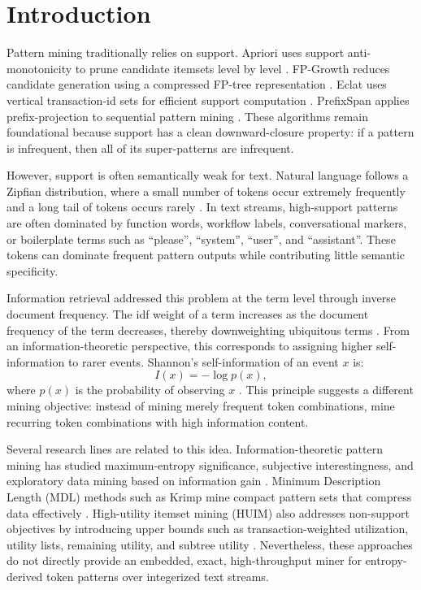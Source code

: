 \documentclass[11pt,a4paper]{article}
\begin{document}
\section{Introduction}

Pattern mining traditionally relies on support. Apriori uses support anti-monotonicity to prune candidate itemsets level by level \cite{AgrawalSrikant1994}. FP-Growth reduces candidate generation using a compressed FP-tree representation \cite{HanPeiYin2000}. Eclat uses vertical transaction-id sets for efficient support computation \cite{Zaki2000}. PrefixSpan applies prefix-projection to sequential pattern mining \cite{Pei2001PrefixSpan}. These algorithms remain foundational because support has a clean downward-closure property: if a pattern is infrequent, then all of its super-patterns are infrequent.

However, support is often semantically weak for text. Natural language follows a Zipfian distribution, where a small number of tokens occur extremely frequently and a long tail of tokens occurs rarely \cite{Zipf1949,Piantadosi2014Zipf}. In text streams, high-support patterns are often dominated by function words, workflow labels, conversational markers, or boilerplate terms such as ``please'', ``system'', ``user'', and ``assistant''. These tokens can dominate frequent pattern outputs while contributing little semantic specificity.

Information retrieval addressed this problem at the term level through inverse document frequency. The idf weight of a term increases as the document frequency of the term decreases, thereby downweighting ubiquitous terms \cite{ManningRaghavanSchutze2008IR}. From an information-theoretic perspective, this corresponds to assigning higher self-information to rarer events. Shannon's self-information of an event \(x\) is:
\[
I(x)=-\log p(x),
\]
where \(p(x)\) is the probability of observing \(x\) \cite{Shannon1948}. This principle suggests a different mining objective: instead of mining merely frequent token combinations, mine recurring token combinations with high information content.

Several research lines are related to this idea. Information-theoretic pattern mining has studied maximum-entropy significance, subjective interestingness, and exploratory data mining based on information gain \cite{Tatti2008MaximumEntropy,DeBie2011SubjectiveInterestingness,Kontonasios2012SubjectiveInterestingness}. Minimum Description Length (MDL) methods such as Krimp mine compact pattern sets that compress data effectively \cite{Vreeken2011Krimp,Galbrun2020MDL}. High-utility itemset mining (HUIM) also addresses non-support objectives by introducing upper bounds such as transaction-weighted utilization, utility lists, remaining utility, and subtree utility \cite{Liu2005TwoPhase,Liu2012HUIMiner,FournierViger2014FHM,Zida2017EFIM}. Nevertheless, these approaches do not directly provide an embedded, exact, high-throughput miner for entropy-derived token patterns over integerized text streams.
\end{document}
